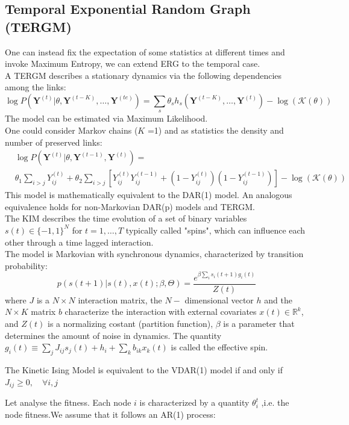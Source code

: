 \subsection{Temporal Exponential Random Graph (TERGM)}
One can instead fix the expectation of some statistics at different times and invoke Maximum Entropy, we can extend ERG to the temporal case.\\
A TERGM describes a stationary dynamics via the following dependencies among the links:
\[
\log P\left(\bm{Y}^{(t)}|\theta, \bm{Y}^{(t-K)},\ldots, \bm{Y}^{(te)}\right) = \sum_s \theta_s h_s \left(\bm{Y}^{(t-K)},\ldots, \bm{Y}^{(t)}\right) - \log(\mathcal{K}(\theta))
\]
The model can be estimated via Maximum Likelihood.\\
One could consider Markov chains ($K$ =1) and as statistics the density and number of preserved links:
\begin{align*}
	&\log P \left(\bm{Y}^{(t)}| \theta, \bm{Y}^{(t-1)},\bm{Y}^{(t)}\right) =\\
	& \theta_1 \sum_{i>j} Y_{ij}^{(t)} + \theta_2 \sum_{i>j} [Y_{ij}^{(t)}Y_{ij}^{(t-1)} + (1- Y^{(t)}_{ij})(1- Y_{ij}^{(t-1)})] - \log (\mathcal{K} (\theta))
\end{align*}
This model is mathematically equivalent to the DAR(1) model. An analogous equivalence holds for non-Markovian DAR(p) models and TERGM.\\
The KIM describes the time evolution of a set of binary variables $s(t) \in \{-1, 1\}^N$ for $t =1,\ldots,T$ typically called "spins", which can influence each other through a time lagged interaction.\\
The model is Markovian with synchronous dynamics, characterized by transition probability:
\[
p(s(t+1)| s(t), x(t); \beta, \Theta) = \frac{e^{\beta \sum_i s_i(t+1)g_i(t)}}{Z(t)}
\]
where $J$ is a $N \times N$ interaction matrix, the $N-$ dimensional vector $h$ and the $N\times K$ matrix $b$ characterize the interaction with external covariates $x(t) \in \mathbb{R}^k$, and $Z(t)$ is a normalizing costant (partition function), $\beta$ is a parameter that determines the amount of noise in dynamics. The quantity $g_i(t) \equiv \sum_j J_{ij}s_j(t) + h_i + \sum_k b_{ik}x_k (t)$ is called the effective spin.
\begin{mytheorem}
	The Kinetic Ising Model is equivalent to the VDAR(1) model if and only if $J_{ij} \geq 0, \quad \forall i,j$
\end{mytheorem}
Let analyse the fitness. Each node $i$ is characterized by a quantity $\theta_i^t$ ,i.e. the node fitness.We assume that it follows an AR(1) process:
